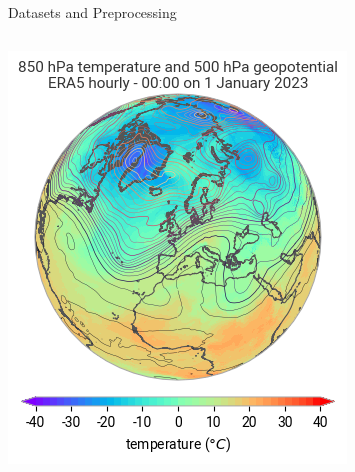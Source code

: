 \documentclass[8pt]{beamer}
\begin{document}
\begin{frame}{Datasets and Preprocessing}
\begin{columns}
        \begin{column}{0.35\textwidth}
            \centering
            \includegraphics[width=\linewidth]{images/overview-detail_67e6d1d5ac470ee33ae510a76a2fe3c1c67a7f1fdd4c040a333969fe0b11f76f.png}
        \end{column}
    \end{columns}
\end{frame}
\end{document}
